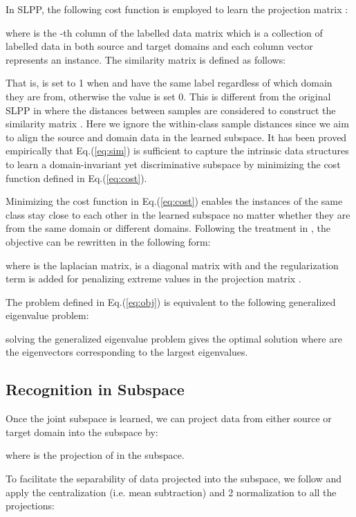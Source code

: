 \documentclass[conference]{IEEEtran}
\begin{document}
In SLPP, the following cost function is employed to learn the projection matrix :

where  is the -th column of the labelled data matrix  which is a collection of labelled data in both source and target domains and each column vector represents an instance. The similarity matrix  is defined as follows:

That is,  is set to 1 when  and  have the same label regardless of which domain they are from, otherwise the value is set 0. This is different from the original SLPP in \cite{wang2017zero} where the distances between samples are considered to construct the similarity matrix . Here we ignore the within-class sample distances since we aim to align the source and domain data in the learned subspace. It has been proved empirically that Eq.(\ref{eq:sim}) is sufficient to capture the intrinsic data structures to learn a domain-invariant yet discriminative subspace by minimizing the cost function defined in Eq.(\ref{eq:cost}).

Minimizing the cost function in Eq.(\ref{eq:cost}) enables the instances of the same class stay close to each other in the learned subspace no matter whether they are from the same domain or different domains. Following the treatment in \cite{he2004locality, wang2017zero}, the objective can be rewritten in the following form:

where  is the laplacian matrix,  is a diagonal matrix with  and the regularization term  is added for penalizing extreme values in the projection matrix .

The problem defined in Eq.(\ref{eq:obj}) is equivalent to the following generalized eigenvalue problem:

solving the generalized eigenvalue problem gives the optimal solution  where  are the eigenvectors corresponding to the largest  eigenvalues.

\subsection{Recognition in Subspace}\label{sec:method_rec}
Once the joint subspace is learned, we can project data from either source or target domain into the subspace by:

where  is the projection of  in the subspace.

To facilitate the separability of data projected into the subspace, we follow \cite{wang2017zero} and apply the centralization (i.e. mean subtraction) and 2 normalization to all the projections:
 
\end{document}
